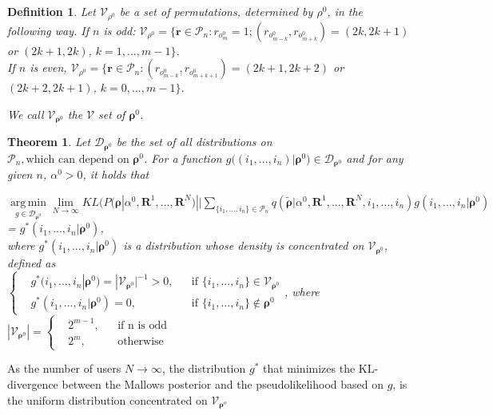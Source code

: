 \documentclass[11pt, oneside]{article}   	%
\newtheorem{theorem}{Theorem}[subsection]
\newtheorem{mydef}{Definition}
\begin{document}
\subsection{ }
\begin{mydef}{
Let $\mathcal{V}_{\rho^0}$ be a set of permutations, determined by $\rho^0$, in the following way. If $n$ is odd:
 $\mathcal{V}_{\rho^0} = \{\bm{r}\in \mathcal{P}_n: r_{o^0_m} = 1; (r_{o^0_{m-k}},r_{o^0_{m+k}}) = (2k, 2k+1) $ or $ (2k+1, 2k)$, $k = 1, ..., m-1\}$. \\
 If $n$ is even,  $\mathcal{V}_{\rho^0} = \{\bm{r}\in \mathcal{P}_n:(r_{o^0_{m-k}},r_{o^0_{m+k+1}}) = (2k+1, 2k+2) $ or $ (2k+2, 2k+1)$, $k = 0, ..., m-1\}$.
 
 We call $\mathcal{V}_{\bm{\rho}^0}$ the $\mathcal{V}$ set of $\bm{\rho}^0$.
}
\end{mydef}
\begin{theorem}\label{theorem:V}
Let	$\mathcal{D}_{\bm{\rho}^0}$ be the set of all distributions on $\mathcal{P}_n, \text{which can depend on } \bm{\rho}^0$. For a function $g\big((i_1, ..., i_n)|\bm{\rho}^0\big)\in\mathcal{D}_{\bm{\rho}^0}$ and for any given $n$, $\alpha^0 > 0$, it holds that

 $\operatorname*{arg\,min}\limits_{g\in\mathcal{D}_{\bm{\rho}^0}}\lim\limits_{N \rightarrow \infty} KL (P(\bm{\rho}|\alpha^0, \bm{R}^1, ...,\bm{R}^N ) || \sum\limits_{\{i_1,..., i_n\} \in \mathcal{P}_n} q (\tilde{\bm{\rho}}|\alpha^0, \bm{R}^1,..., \bm{R}^N, i_1,...,i_n) g(i_1,...,i_n|\bm{\rho}^0)$ \\
= $g^*(i_1,...,i_n|{{\bm{\rho}}^0})$, \\where
		$g^*(i_1, ..., i_n |{\bm{\rho}^0})$ is a distribution whose density is concentrated on $\mathcal{V}_{\bm{\rho}^0}$, defined as \\
		  $
		\left \{
		\begin{aligned}
		&g^*(i_1, ..., i_n | {\bm{\rho}^0}) = |\mathcal{V}_{\bm{\rho}^0}|^{-1}>0 , && \text{if } \{i_1,...,i_n\}\in \mathcal{V}_{\bm{\rho}^0}\\
		&g^*(i_1, ..., i_n | {\bm{\rho}^0}) = 0 , && \text{if } \{i_1,...,i_n\}\notin {\bm{\rho}^0}
		\end{aligned} \right.
		$, where $|\mathcal{V}_{\bm{\rho}^0}|
			= \left \{
			\begin{aligned}
			&2^{m-1}, && \text{if n is odd} \\
			&2^m, && \text{otherwise}
			\end{aligned} \right.
			$

\end{theorem}
As the number of users $N \rightarrow \infty$, the distribution $g^*$ that minimizes the KL-divergence between the Mallows posterior and the pseudolikelihood based on $g$, is the uniform distribution concentrated on $\mathcal{V}_{\bm{\rho}^o}$
\end{document}
